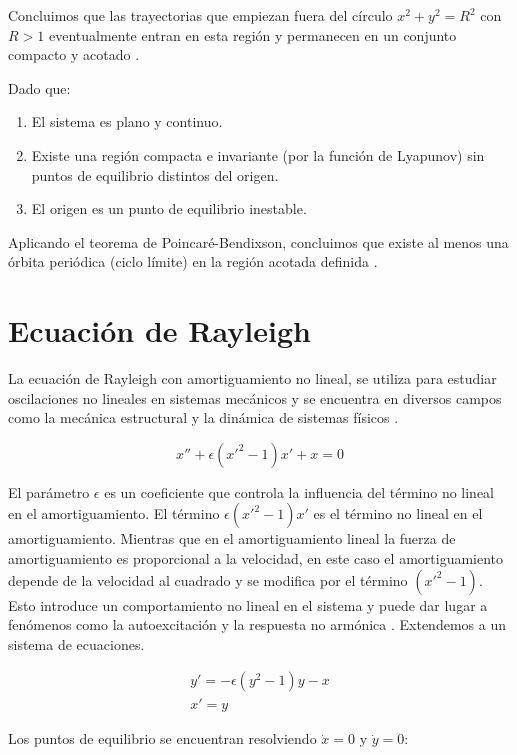 Concluimos que las trayectorias que empiezan fuera del círculo \( x^2 + y^2 = R^2 \) con \( R > 1 \) eventualmente entran en esta región y permanecen en un conjunto compacto y acotado \cite{hahn1967stability}.

Dado que:

\begin{enumerate}
    \item El sistema es plano y continuo.
    \item Existe una región compacta e invariante (por la función de Lyapunov) sin puntos de equilibrio distintos del origen.
    \item El origen es un punto de equilibrio inestable.
\end{enumerate}

Aplicando el teorema de Poincaré-Bendixson, concluimos que existe al menos una órbita periódica (ciclo límite) en la región acotada definida \cite{lasalle1961stability}.
\section{Ecuación de Rayleigh}
La ecuación de Rayleigh con amortiguamiento no lineal, se utiliza
para estudiar oscilaciones no lineales en sistemas mecánicos y se encuentra en
diversos campos como la mecánica estructural y la dinámica de sistemas físicos \cite{rayleigh1883theory}.

$$x''+\epsilon(x'^2-1)x'+x=0$$

El parámetro $\epsilon$ es un coeficiente que controla la influencia del término no lineal en el amortiguamiento.
El término $\epsilon(x'^2 - 1)x'$ es el término no lineal en el amortiguamiento. Mientras que en el amortiguamiento
lineal la fuerza de amortiguamiento es proporcional a la velocidad, en este caso el amortiguamiento depende de
la velocidad al cuadrado y se modifica por el término $(x'^2 - 1)$. Esto introduce un comportamiento no lineal en el
sistema y puede dar lugar a fenómenos como la autoexcitación y la respuesta no armónica \cite{strogatz2018nonlinear}.
Extendemos a un sistema de ecuaciones.

\begin{equation}\label{eq: Rayleigh}
	\begin{matrix}
		y'=-\epsilon(y^2-1)y-x \\ 
		x'=y
	\end{matrix}
\end{equation}

Los puntos de equilibrio se encuentran resolviendo \(\dot{x} = 0\) y \(\dot{y} = 0\):

